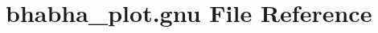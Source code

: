 \hypertarget{bhabha__plot_8gnu}{}\section{bhabha\+\_\+plot.\+gnu File Reference}
\label{bhabha__plot_8gnu}
